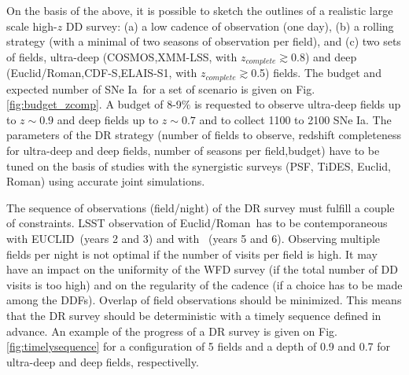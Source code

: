 \documentclass[\docopts]{\docclass}
\newcommand{\cosmos}{{COSMOS}}
\newcommand{\elais}{{ELAIS-S1}}
\newcommand{\xmm}{{XMM-LSS}}
\newcommand{\cdfs}{{CDF-S}}
\newcommand{\adfs}{{Euclid/Roman}}
\newcommand{\euclid}{{EUCLID}}
\newcommand{\sne}{{SNe Ia}}
\newcommand{\zcomp}{\mbox{$z_{complete}$}}
\begin{document}
\par
On the basis of the above, it is possible to sketch the outlines of a realistic large scale high-$z$ DD survey: (a) a low cadence of observation (one day), (b) a rolling strategy (with a minimal of two seasons of observation per field), and (c) two sets of fields, ultra-deep (\cosmos,\xmm, with \zcomp$\gtrsim$0.8) and deep (\adfs,\cdfs,\elais, with \zcomp$\gtrsim$0.5) fields. The budget and expected number of \sne~for a set of scenario is given on Fig. \ref{fig:budget_zcomp}. A budget of 8-9$\%$ is requested to observe ultra-deep fields up to $z\sim0.9$ and deep fields up to $z\sim0.7$ and to collect 1100 to 2100 \sne. The parameters of the DR strategy (number of fields to observe, redshift completeness for ultra-deep and deep fields, number of seasons per field,budget) have to be tuned on the basis of studies with the synergistic surveys (PSF, TiDES, Euclid, Roman) using accurate joint simulations.
\par
The sequence of observations (field/night) of the DR survey must fulfill a couple of constraints. LSST observation of \adfs~has to be contemporaneous with \euclid~(years 2 and 3) and with \roman~(years 5 and 6). Observing multiple fields per night is not optimal if the number of visits per field is high. It may have an impact on the uniformity of the WFD survey (if the total number of DD visits is too high) and on the regularity of the cadence (if a choice has to be made among the DDFs). Overlap of field observations should be minimized. This means that the DR survey should be deterministic with a timely sequence defined in advance. An example of the progress of a DR survey is given on Fig. \ref{fig:timelysequence} for a configuration of 5 fields and a depth of 0.9 and 0.7 for ultra-deep and deep fields, respectivelly. 
\end{document}
